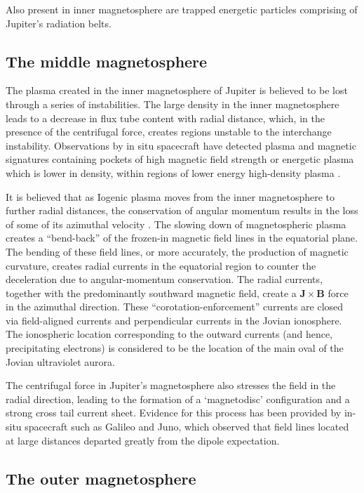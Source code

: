 Also present in inner magnetosphere are trapped energetic particles comprising of Jupiter's radiation belts. 

\subsection{The middle magnetosphere}
The plasma created in the inner magnetosphere of Jupiter is believed to be lost through a series of instabilities. The large density in the inner magnetosphere leads to a decrease in flux tube content with radial distance, which, in the presence of the centrifugal force, creates regions unstable to the interchange instability. Observations by in situ spacecraft have detected plasma and magnetic signatures containing pockets of high magnetic field strength or energetic plasma which is lower in density, within regions of lower energy high-density plasma \cite{Thorne1997GalileoTorus,Kivelson1997IntermittentInterchange}. 

It is believed that as Iogenic plasma moves from the inner magnetosphere to further radial distances, the conservation of angular momentum results in the loss of some of its azimuthal velocity \cite{Cowley2001a,Hill2001,Southwood2001a}. The slowing down of magnetospheric plasma creates a ``bend-back'' of the frozen-in magnetic field lines in the equatorial plane. The bending of these field lines, or more accurately, the production of magnetic curvature, creates radial currents in the equatorial region to counter the deceleration due to angular-momentum conservation. The radial currents, together with the predominantly southward magnetic field, create a $\mathbf{J}\times\mathbf{B}$ force in the azimuthal direction. These ``corotation-enforcement'' currents are closed via field-aligned currents and perpendicular currents in the Jovian ionosphere. The ionospheric location corresponding to the outward currents (and hence, precipitating electrons) is considered to be the location of the main oval of the Jovian ultraviolet aurora.

The centrifugal force in Jupiter's magnetosphere also stresses the field in the radial direction, leading to the formation of a `magnetodisc' configuration and a strong cross tail current sheet. Evidence for this process has been provided by in-situ spacecraft such as Galileo and Juno, which observed that field lines located at large distances departed greatly from the dipole expectation. 

\subsection{The outer magnetosphere}

